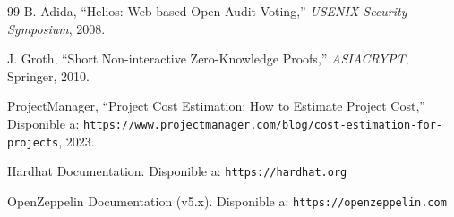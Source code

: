 \documentclass[12pt,a4paper,catalan]{article}
\begin{document}
\begin{thebibliography}{99}
B. Adida,
``Helios: Web-based Open-Audit Voting,''
\textit{USENIX Security Symposium}, 2008.

J. Groth,
``Short Non-interactive Zero-Knowledge Proofs,''
\textit{ASIACRYPT}, Springer, 2010.

ProjectManager,
``Project Cost Estimation: How to Estimate Project Cost,''
Disponible a: \texttt{https://www.projectmanager.com/blog/cost-estimation-for-projects}, 2023.

Hardhat Documentation. Disponible a: \texttt{https://hardhat.org}

OpenZeppelin Documentation (v5.x). Disponible a: \texttt{https://openzeppelin.com}

\end{thebibliography}
\end{document}
